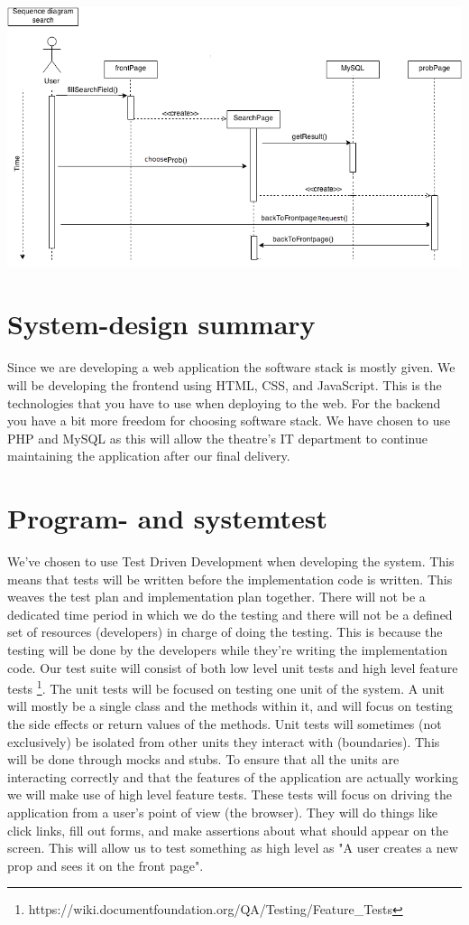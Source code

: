 \documentclass[12pt]{article}
\begin{document}
\includegraphics[scale=0.6]{sequenceDiagram_search.png}\\
\section{System-design summary}
Since we are developing a web application the software stack is mostly given. We will be developing the frontend using HTML, CSS, and JavaScript. This is the technologies that you have to use when deploying to the web.
\newline
For the backend you have a bit more freedom for choosing software stack. We have chosen to use PHP and MySQL as this will allow the theatre's IT department to continue maintaining the application after our final delivery.
\section{Program- and systemtest}
We've chosen to use Test Driven Development when developing the system. This means that tests will be written before the implementation code is written. This weaves the test plan and implementation plan together. There will not be a dedicated time period in which we do the testing and there will not be a defined set of resources (developers) in charge of doing the testing. This is because the testing will be done by the developers while they're writing the implementation code.
\newline
Our test suite will consist of both low level unit tests and high level feature tests \footnote{https://wiki.documentfoundation.org/QA/Testing/Feature\_Tests}. The unit tests will be focused on testing one unit of the system. A unit will mostly be a single class and the methods within it, and will focus on testing the side effects or return values of the methods. Unit tests will sometimes (not exclusively) be isolated from other units they interact with (boundaries). This will be done through mocks and stubs.
\newline
\newline
To ensure that all the units are interacting correctly and that the features of the application are actually working we will make use of high level feature tests. These tests will focus on driving the application from a user's point of view (the browser). They will do things like click links, fill out forms, and make assertions about what should appear on the screen. This will allow us to test something as high level as "A user creates a new prop and sees it on the front page".
\end{document}
